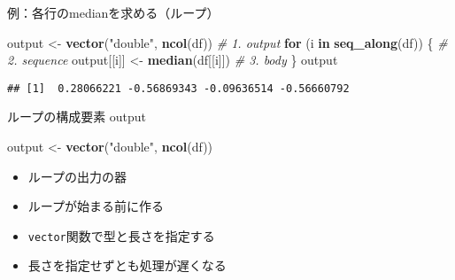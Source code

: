 \documentclass[ignorenonframetext,]{beamer}
\newenvironment{Shaded}{\begin{snugshade}}{\end{snugshade}}
\newcommand{\KeywordTok}[1]{\textcolor[rgb]{0.13,0.29,0.53}{\textbf{#1}}}
\newcommand{\StringTok}[1]{\textcolor[rgb]{0.31,0.60,0.02}{#1}}
\newcommand{\CommentTok}[1]{\textcolor[rgb]{0.56,0.35,0.01}{\textit{#1}}}
\newcommand{\ControlFlowTok}[1]{\textcolor[rgb]{0.13,0.29,0.53}{\textbf{#1}}}
\newcommand{\NormalTok}[1]{#1}
\providecommand{\tightlist}{%
  \setlength{\itemsep}{0pt}\setlength{\parskip}{0pt}}
\begin{document}
\begin{frame}[fragile]{例：各行のmedianを求める（ループ）}

\begin{Shaded}
\begin{Highlighting}[]
\NormalTok{output <-}\StringTok{ }\KeywordTok{vector}\NormalTok{(}\StringTok{"double"}\NormalTok{, }\KeywordTok{ncol}\NormalTok{(df))  }\CommentTok{# 1. output}
\ControlFlowTok{for}\NormalTok{ (i }\ControlFlowTok{in} \KeywordTok{seq_along}\NormalTok{(df)) \{            }\CommentTok{# 2. sequence}
\NormalTok{  output[[i]] <-}\StringTok{ }\KeywordTok{median}\NormalTok{(df[[i]])      }\CommentTok{# 3. body}
\NormalTok{\}}
\NormalTok{output}
\end{Highlighting}
\end{Shaded}

\begin{verbatim}
## [1]  0.28066221 -0.56869343 -0.09636514 -0.56660792
\end{verbatim}

\end{frame}

\begin{frame}[fragile]{ループの構成要素 output}

\begin{Shaded}
\begin{Highlighting}[]
\NormalTok{output <-}\StringTok{ }\KeywordTok{vector}\NormalTok{(}\StringTok{"double"}\NormalTok{, }\KeywordTok{ncol}\NormalTok{(df))}
\end{Highlighting}
\end{Shaded}

\begin{itemize}
\tightlist
\item
  ループの出力の器
\item
  ループが始まる前に作る
\item
  \texttt{vector}関数で型と長さを指定する
\item
  長さを指定せずとも処理が遅くなる
\end{itemize}

\end{frame}
\end{document}
